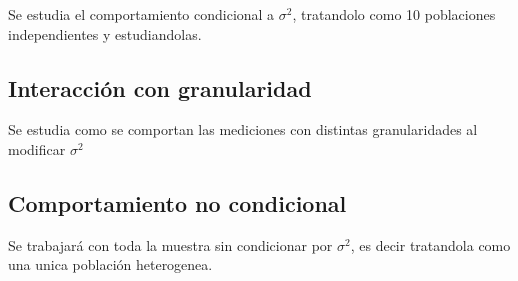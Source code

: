 Se estudia el comportamiento condicional a $\sigma^2$, tratandolo como 10 poblaciones independientes y estudiandolas.

\subsection{Interacción con granularidad}

Se estudia como se comportan las mediciones con distintas granularidades al modificar $\sigma^2$

\subsection{Comportamiento no condicional}

Se trabajará con toda la muestra sin condicionar por $\sigma^2$, es decir tratandola como una unica población heterogenea.
